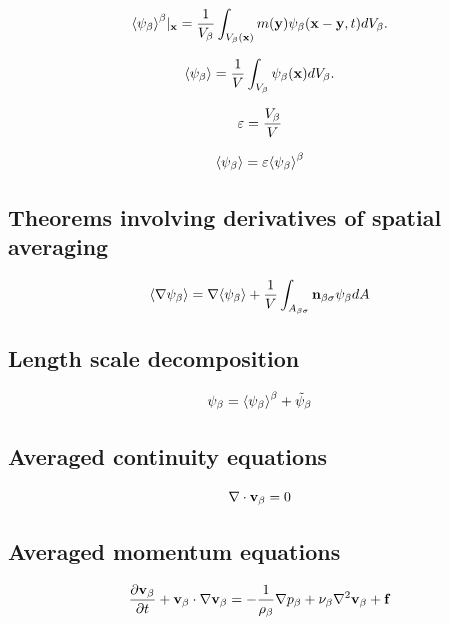 \begin{equation}
{\left< \psi_{\beta} \right>}^{\beta}|_{\mathbf{x}} = \dfrac{1}{V_\beta} \int_{V_\beta(\mathbf{x})}  m(\mathbf{y}) \psi_{\beta}(\mathbf{x}-\mathbf{y}, t) d V_\beta.
\label{eq:avg_intrinsic_ext}
\end{equation}

\begin{equation}
{\left< \psi_{\beta} \right>} = \dfrac{1}{V} \int_{V_\beta} \psi_\beta (\mathbf{x}) d V_\beta.
\label{eq:avg_superficial}
\end{equation}


\begin{equation}
	\varepsilon = \dfrac{V_\beta}{V}
	\label{eq:porosity}
\end{equation}

\begin{equation}
	{\left< \psi_{\beta} \right>} =  \varepsilon {\left< \psi_{\beta} \right>}^{\beta}
\end{equation}

\subsection{Theorems involving derivatives of spatial averaging}

\begin{theorem}
\[	{\left< \nabla \psi_{\beta} \right>} = \nabla {\left< \psi_{\beta} \right>} + \dfrac{1}{V}\int_{A_{\beta \sigma}} \mathbf{n}_{\beta \sigma} \psi_{\beta} dA \]
\end{theorem}


\subsection{Length scale decomposition}

\begin{equation}
	\psi_{\beta} = {\left< \psi_{\beta} \right>}^{\beta} + \tilde{\psi}_{\beta}
 \end{equation}

\subsection{Averaged continuity equations}


\begin{equation}
\nabla \cdot \textbf{v}_{\beta} = 0
\label{eq:cont}
\end{equation}

\subsection{Averaged momentum equations}


\begin{equation}
\dfrac{\partial \textbf{v}_{\beta}}{\partial t} + \textbf{v}_{\beta} \cdot \nabla \textbf{v}_{\beta} = -\frac{1}{\rho_{\beta}} \nabla p_{\beta} + \nu_{\beta} \nabla^2  \textbf{v}_{\beta}  + \mathbf{f}
\label{eq:mom}
\end{equation}





